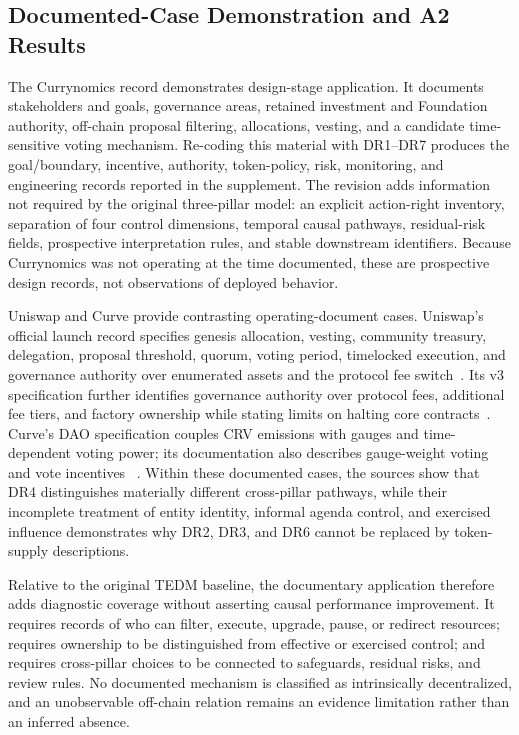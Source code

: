 \documentclass[referee,sn-basic]{sn-jnl}
\begin{document}
\subsection{Documented-Case Demonstration and A2 Results}
\label{subsec:demonstration}
\label{subsec:results-a2}

The Currynomics record demonstrates design-stage application. It documents
stakeholders and goals, governance areas, retained investment and Foundation
authority, off-chain proposal filtering, allocations, vesting, and a candidate
time-sensitive voting mechanism. Re-coding this material with DR1--DR7 produces
the goal/boundary, incentive, authority, token-policy, risk, monitoring, and
engineering records reported in the supplement. The revision adds information not required by the original
three-pillar model: an explicit action-right inventory, separation of four
control dimensions, temporal causal pathways, residual-risk fields, prospective
interpretation rules, and stable downstream identifiers. Because Currynomics
was not operating at the time documented, these are prospective design records,
not observations of deployed behavior.

Uniswap and Curve provide contrasting operating-document cases. Uniswap's
official launch record specifies genesis allocation, vesting, community
treasury, delegation, proposal threshold, quorum, voting period, timelocked
execution, and governance authority over enumerated assets and the protocol fee
switch~\cite{Uniswap2020UNI}. Its v3 specification further identifies governance
authority over protocol fees, additional fee tiers, and factory ownership while
stating limits on halting core contracts~\cite{Uniswap2021V3}. Curve's DAO
specification couples CRV emissions with gauges and time-dependent voting power;
its documentation also describes gauge-weight voting and vote incentives
~\cite{CurveDAO2020,CurveDocs2026}. Within these documented cases, the sources
show that DR4 distinguishes materially different cross-pillar pathways, while their
incomplete treatment of entity identity, informal agenda control, and exercised
influence demonstrates why DR2, DR3, and DR6 cannot be replaced by token-supply
descriptions.

Relative to the original TEDM baseline, the documentary application therefore
adds diagnostic coverage without asserting causal performance improvement. It
requires records of who can filter, execute, upgrade, pause, or redirect
resources; requires ownership to be distinguished from effective or exercised
control; and requires cross-pillar choices to be connected to safeguards,
residual risks, and review
rules. No documented mechanism is classified as intrinsically decentralized,
and an unobservable off-chain relation remains an evidence limitation rather
than an inferred absence.
\end{document}
